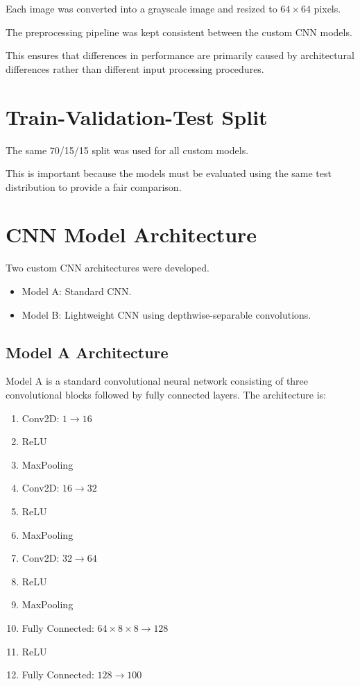 \documentclass[12pt,a4paper]{report}
\begin{document}
Each image was converted into a grayscale image and resized to
$64\times64$ pixels.

The preprocessing pipeline was kept consistent between the
custom CNN models.

This ensures that differences in performance are primarily caused
by architectural differences rather than different input
processing procedures.

\section{Train-Validation-Test Split}

The same 70/15/15 split was used for all custom models.

This is important because the models must be evaluated using
the same test distribution to provide a fair comparison.

\section{CNN Model Architecture}

Two custom CNN architectures were developed.

\begin{itemize}
    \item Model A: Standard CNN.
    \item Model B: Lightweight CNN using depthwise-separable
    convolutions.
\end{itemize}

\subsection{Model A Architecture}

Model A is a standard convolutional neural network consisting
of three convolutional blocks followed by fully connected layers.
\newpage
The architecture is:

\begin{enumerate}
    \item Conv2D: $1\rightarrow16$
    \item ReLU
    \item MaxPooling
    \item Conv2D: $16\rightarrow32$
    \item ReLU
    \item MaxPooling
    \item Conv2D: $32\rightarrow64$
    \item ReLU
    \item MaxPooling
    \item Fully Connected: $64\times8\times8\rightarrow128$
    \item ReLU
    \item Fully Connected: $128\rightarrow100$
\end{enumerate}
\end{document}
